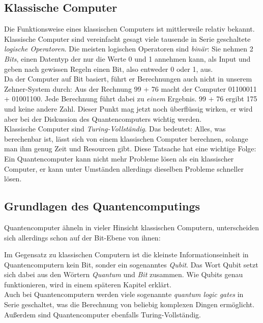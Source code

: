 \documentclass[12pt]{article}
\begin{document}
\subsection{Klassische Computer}

Die Funktionsweise eines klassischen Computers ist mittlerweile relativ bekannt. Klassische Computer sind vereinfacht gesagt viele tausende in Serie geschaltete \textit{logische Operatoren}. Die meisten logischen Operatoren sind \textit{binär}: Sie nehmen 2 \textit{Bits}, einen Datentyp der nur die Werte 0 und 1 annehmen kann, als Input und geben nach gewissen Regeln einen Bit, also entweder 0 oder 1, aus. \cite{quantum1998} \\

Da der Computer auf Bit basiert, führt er Berechnungen auch nicht in unserem Zehner-System durch: Aus der Rechnung 99 + 76 macht der Computer 01100011 + 01001100. Jede Berechnung führt dabei zu \textit{einem} Ergebnis. 99 + 76 ergibt 175 und keine andere Zahl. Dieser Punkt mag jetzt noch überflüssig wirken, er wird aber bei der Diskussion des Quantencomputers wichtig werden. \\

Klassische Computer sind \textit{Turing-Vollständig}. Das bedeutet: Alles, was berechenbar ist, lässt sich von einem klassischen Computer berechnen, solange man ihm genug Zeit und Resourcen gibt. \cite{TuringWiki} Diese Tatsache hat eine wichtige Folge: \\
Ein Quantencomputer kann nicht mehr Probleme lösen als ein klassischer Computer, er kann unter Umständen allerdings dieselben Probleme schneller lösen.

\subsection{Grundlagen des Quantencomputings}

Quantencomputer ähneln in vieler Hinsicht klassischen Computern, unterscheiden sich allerdings schon auf der Bit-Ebene von ihnen:

Im Gegensatz zu klassischen Computern ist die kleinste Informationseinheit in Quantencomputern kein Bit, sonder ein sogenanntes \textit{Qubit}. Das Wort Qubit setzt sich dabei aus den Wörtern \textit{Quantum} und \textit{Bit} zusammen. \cite{quantum1998} Wie Qubits genau funktionieren, wird in einem späteren Kapitel erklärt. \\

Auch bei Quantencomputern werden viele sogenannte \textit{quantum logic gates} in Serie geschaltet, was die Berechnung von beliebig komplexen Dingen ermöglicht. Außerdem sind Quantencomputer ebenfalls Turing-Vollständig. \cite{quantum1998}
\end{document}

